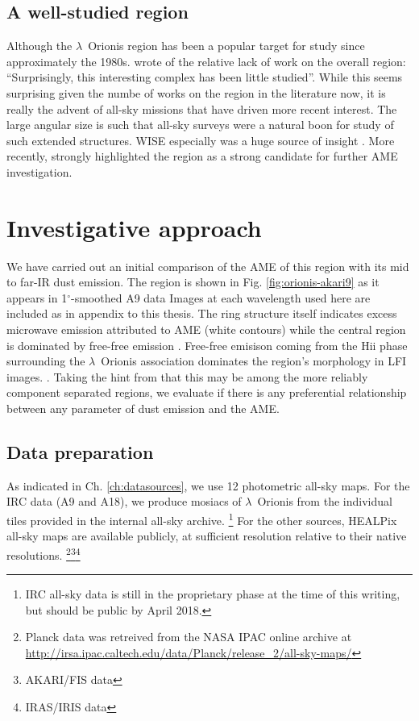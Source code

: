   \subsection{A well-studied region}
    Although the $\lambda$~Orionis region has been a popular target for study since approximately the 1980s.\cite{duerr82} wrote of the relative lack of work on the overall region: ``Surprisingly, this interesting complex has been little studied''. While this seems surprising given the numbe of works on the region in the literature now, it is really the advent of all-sky missions that have driven more recent interest.  The large angular size is such that all-sky surveys were a natural boon for study of such extended structures. WISE especially was a huge source of insight \citep{koenig15}. More recently, \cite{planck15XXV} strongly highlighted the region as a strong candidate for further AME investigation.


	\section{Investigative approach}
      We have carried out an initial comparison of the AME of this region with its mid to far-IR dust emission. The region is shown in Fig. \ref{fig:orionis-akari9} as it appears in 1$^{\circ}$-smoothed A9 data
      Images at each wavelength used here are included as in appendix to this thesis.
       The ring structure itself indicates excess microwave emission attributed to AME (white contours) while the central region is dominated by free-free emission \citep{aran09, koenig15}. Free-free emisison coming from the Hii phase surrounding the $\lambda$~Orionis association dominates the region's morphology in LFI images. \citep{planck15XXV}. Taking the hint from \cite{planck15XXV} that this may be among the more reliably component separated regions, we evaluate if there is any preferential relationship between any parameter of dust emission and the AME.

		\subsection{Data preparation}
			As indicated in Ch. \hyperref[ch:datasources]{\ref{ch:datasources}}, we use 12 photometric all-sky maps. For the IRC data (A9 and A18), we produce mosiacs of $\lambda$~Orionis from the individual tiles provided in the internal all-sky archive.
      \footnote{IRC all-sky data is still in the proprietary phase at the time of this writing, but should be public by April 2018.}
       For the other sources, HEALPix all-sky maps are available publicly, at sufficient resolution relative to their native resolutions. \footnote{Planck data was retreived from the NASA IPAC online archive at \url{http://irsa.ipac.caltech.edu/data/Planck/release_2/all-sky-maps/}}\footnote{AKARI/FIS data }\footnote{IRAS/IRIS data }

